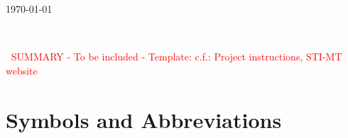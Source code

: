 \documentclass[a4paper, 12pt]{report}
\begin{document}
\begin{titlepage}
{\large \today}\\ %


\vfill %

\end{titlepage}

\newpage
$\ $
\thispagestyle{empty}
\newpage

\thispagestyle{empty}
\newpage
$\ $
\thispagestyle{empty}
\newpage
%
\textcolor{red}{SUMMARY - To be included - Template: c.f.: Project instructions, STI-MT website}
\thispagestyle{empty}
\newpage
$\ $
\thispagestyle{empty}
\newpage
\tableofcontents
\thispagestyle{empty}

\newpage

\section*{Symbols and Abbreviations}
\end{document}
